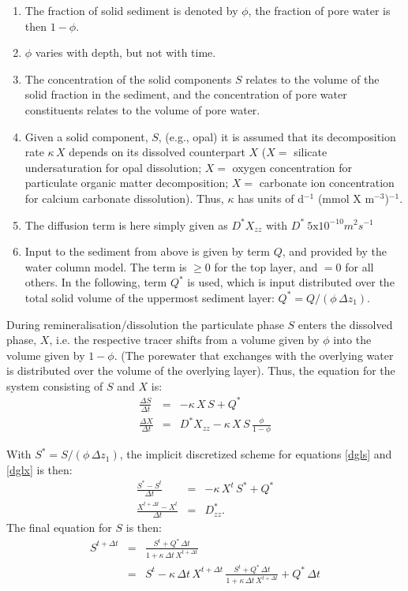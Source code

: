 \documentclass[11pt,a4paper,fleqn,twoside]{article}
\begin{document}
\begin{enumerate}
\item The fraction of solid sediment is denoted by $\phi$, the fraction of pore
water is then $1 - \phi$. 
\item $\phi$ varies with depth, but not with time.
\item The concentration of the solid components $S$ relates to the volume of the solid
fraction in the sediment, and the concentration of pore water constituents
relates to the volume of pore water.
\item Given a solid component, $S$, (e.g., opal) it is assumed that its 
decomposition rate $\kappa \, X$ depends on its dissolved counterpart $X$ ($X = $
silicate undersaturation  for opal dissolution; $X = $ oxygen concentration for
particulate organic matter decomposition;  $X = $ carbonate ion concentration
for calcium carbonate dissolution). Thus, $\kappa$ has units of  d$^{-1}$ (mmol X
m$^{-3}$)$^{-1}$.
\item The diffusion term is here simply given as $D^*X_{zz}$
 with $D^*~5 \mathrm{x} 10^{-10}m^2s^{-1}$
\item Input to the sediment from above is given by term $Q$, and provided by the
water column model. The term is $\ge 0$ for the top layer, and $ = 0$ for all
others. In the following, term $Q^*$ is used, which is input distributed over 
the total solid volume of the uppermost sediment layer: $Q^* = Q / (\phi\, \Delta
z_1)$.
\end{enumerate}

During remineralisation/dissolution the particulate phase $S$ 
enters the dissolved phase, $X$, i.e. the respective tracer shifts from a
volume given by $\phi$  into the volume given by $1-\phi$.  (The porewater that
exchanges with the overlying water is distributed over the volume of the
overlying layer). Thus, the equation for the system consisting of $S$ and $X$
is: 
\begin{eqnarray}
\frac{\Delta S}{\Delta t} & = & -\kappa \, X \, S  + Q^*\label{dgls}\\
\frac{\Delta X}{\Delta t} & = & D^*X_{zz} - \kappa \, X \, S \, \frac{\phi}{1-\phi}\label{dglx}
\end{eqnarray}

With $S^* = S / (\phi\, \Delta z_1) $, the implicit discretized scheme for 
equations \ref{dgls} and \ref{dglx} is then:
\begin{eqnarray}
\frac{S^*-S^{t}}{\Delta t} & = & -\kappa \, X^{t} \, 
S^*  + Q^*\label{diss}\\
\frac{X^{t+\Delta t}-X^{t}}{\Delta t} & = & D^*_{zz} .
\end{eqnarray}
The final equation for $S$ is then:
\begin{eqnarray}
S^{t+\Delta t} & = & \frac{S^t+Q^*\, \Delta t}
{1+\kappa \, \Delta t \, X^{t+\Delta t}} \label{sfinal1}\\ 
& = & S^t - \kappa \, \Delta t \, X^{t+\Delta t} \, 
\frac{ S^{t} + Q^* \, \Delta t} {1+ \kappa \,  \Delta t \,
X^{t + \Delta t}} + Q^* \, \Delta t \label{sfinal2}
\end{eqnarray}
\end{document}
